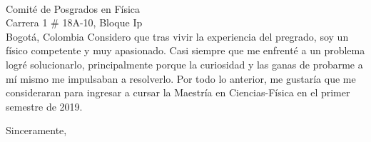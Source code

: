 \documentclass[10pt]{letter} %
\begin{document}
\begin{letter}{\\ Comité de Posgrados en Física \\ Carrera 1 \# 18A-10, Bloque Ip \\ Bogotá, Colombia}
Considero que tras vivir la experiencia del pregrado, soy un físico competente y muy apasionado. Casi siempre que me enfrenté a un problema logré solucionarlo, principalmente porque la curiosidad y las ganas de probarme a mí mismo me impulsaban a resolverlo. Por todo lo anterior, me gustaría que me consideraran para ingresar a cursar la Maestría en Ciencias-Física en el primer semestre de 2019.



\vspace{2\parskip} %
\closing{Sinceramente,}
\vspace{2\parskip} %



\end{letter}
 
\end{document}
